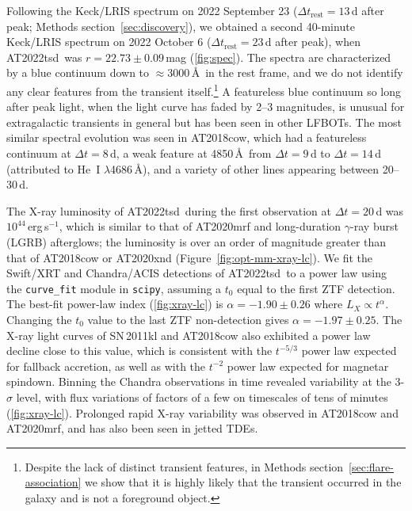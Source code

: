 \documentclass{nature_plusfigure}
\newcommand{\at}{AT2022tsd}
\begin{document}
\begin{methods}
Following the Keck/LRIS spectrum on 2022 September 23 ($\Delta t_\mathrm{rest}=13\,$d after peak; Methods section~\ref{sec:discovery}), we obtained a second 40-minute Keck/LRIS spectrum on 2022 October 6 ($\Delta t_\mathrm{rest}=23$\,d after peak), when \at\ was $r=22.73\pm0.09\,$mag (\ref{fig:spec}). 
The spectra are characterized by a blue continuum down to $\approx3000\,$\AA\ in the rest frame, and we do not identify any clear features from the transient itself.\footnote{Despite the lack of distinct transient features, in Methods section~\ref{sec:flare-association} we show that it is highly likely that the transient occurred in the galaxy and is not a foreground object.} A featureless blue continuum so long after peak light, when the light curve has faded by 2--3 magnitudes, is unusual for extragalactic transients in general\cite{GalYam2017hsn} but has been seen in other LFBOTs.
The most similar spectral evolution was seen in AT2018cow\cite{Perley2019}, which had a featureless continuum at $\Delta t=8$\,d, a weak feature at 4850\,\AA\ from $\Delta t=9$\,d to $\Delta t=14$\,d (attributed to He~I $\lambda$4686\,\AA), and a variety of other lines appearing between 20--30\,d.

The X-ray luminosity of \at\ during the first observation at $\Delta t=20$\,d was $10^{44}\,$erg\,s$^{-1}$, which is similar to that of AT2020mrf\cite{Yao2022} and long-duration $\gamma$-ray burst (LGRB) afterglows; the luminosity is over an order of magnitude greater than that of AT2018cow\cite{RiveraSandoval2018,Margutti2019,Ho2019} or AT2020xnd\cite{Ho2022_AT2020xnd,Bright2022} (Figure~\ref{fig:opt-mm-xray-lc}).
We fit the Swift/XRT and Chandra/ACIS detections of \at\ to a power law using the \texttt{curve\_fit} module in \texttt{scipy}, assuming a $t_0$ equal to the first ZTF detection. The best-fit power-law index (\ref{fig:xray-lc}) is $\alpha=-1.90\pm0.26$ where $L_X \propto t^{\alpha}$.
Changing the $t_0$ value to the last ZTF non-detection gives $\alpha=-1.97\pm0.25$.
The X-ray light curves of SN\,2011kl and AT2018cow also exhibited a power law decline close to this value\cite{Margutti2019,Ho2019},
which is consistent with the $t^{-5/3}$ power law expected for fallback accretion\cite{Phinney1989}, as well as with the $t^{-2}$ power law expected for magnetar spindown.
Binning the Chandra observations in time revealed variability at the 3-$\sigma$ level, with flux variations of factors of a few on timescales of tens of minutes (\ref{fig:xray-lc}). Prolonged rapid X-ray variability was observed in AT2018cow\cite{RiveraSandoval2018,Margutti2019,Ho2019} and AT2020mrf\cite{Yao2022}, and has also been seen in jetted TDEs\cite{Levan2011,Burrows2011,Cenko2012}.


\end{methods}
\end{document}
